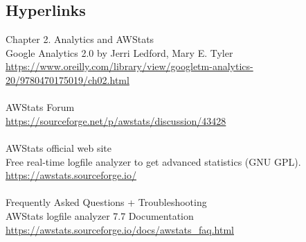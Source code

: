 
\subsection{Hyperlinks}

Chapter 2. Analytics and AWStats\\
Google Analytics 2.0 by Jerri Ledford, Mary E. Tyler\\
\href{https://www.oreilly.com/library/view/googletm-analytics-20/9780470175019/ch02.html}{https://www.oreilly.com/library/view/googletm-analytics-20/9780470175019/ch02.html}\\
\\
AWStats Forum\\
\href{https://sourceforge.net/p/awstats/discussion/43428}{https://sourceforge.net/p/awstats/discussion/43428}\\
\\
AWStats official web site\\
Free real-time logfile analyzer to get advanced statistics (GNU GPL).\\
\href{https://awstats.sourceforge.io/}{https://awstats.sourceforge.io/}\\
\\
Frequently Asked Questions + Troubleshooting\\
AWStats logfile analyzer 7.7 Documentation\\
\href{https://awstats.sourceforge.io/docs/awstats\_faq.html}{https://awstats.sourceforge.io/docs/awstats\_faq.html}
